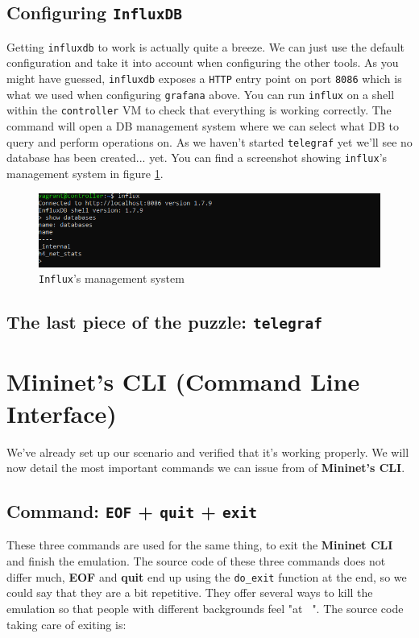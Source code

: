 \documentclass[12pt]{article}
\begin{document}
	\subsection{Configuring  \texttt{InfluxDB}}
		Getting \texttt{influxdb} to work is actually quite a breeze. We can just use the default configuration and take it into account when configuring the other tools. As you might have guessed, \texttt{influxdb} exposes a \texttt{HTTP} entry point on port \texttt{8086} which is what we used when configuring \texttt{grafana} above. You can run \texttt{influx} on a shell within the \texttt{controller} VM to check that everything is working correctly. The command will open a DB management system where we can select what DB to query and perform operations on. As we haven't started \texttt{telegraf} yet we'll see no database has been created... yet. You can find a screenshot showing \texttt{influx}'s management system in figure \ref{f:influx}.

		\begin{figure}
			\centering
			\includegraphics[width=\linewidth]{influx.png}
			\caption{\texttt{Influx}'s management system}
			\label{f:influx}
		\end{figure}

	\subsection{The last piece of the puzzle: \texttt{telegraf}}

\section{Mininet's CLI (\textbf{C}ommand \textbf{L}ine \textbf{I}nterface)}
	We've already set up our scenario and verified that it's working properly. We will now detail the most important commands we can issue from of \textbf{Mininet's CLI}.

	\subsection{Command: \texttt{EOF} + \texttt{quit} + \texttt{exit}}
		These three commands are used for the same thing, to exit the \textbf{Mininet CLI} and finish the emulation. The source code of these three commands does not differ much, \textbf{EOF} and \textbf{quit} end up using the \texttt{do\_exit} function at the end, so we could say that they are a bit repetitive. They offer several ways to kill the emulation so that people with different backgrounds feel "at \texttt{~}". The source code taking care of exiting is:
\end{document}
